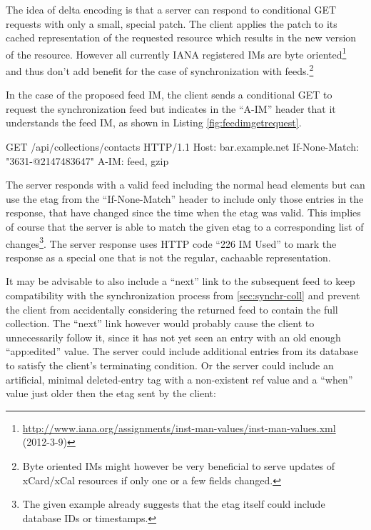 \documentclass[11pt,a4paper,headsepline,twoside]{scrartcl}		%
\newcommand{\citeurl}[2]{\url{#1} (#2)}
\begin{document}
The idea of delta encoding is that a server can respond to conditional GET
requests with only a small, special patch. The client applies the patch to its
cached representation of the requested resource which results in the new version
of the resource. However all currently IANA registered IMs are byte
oriented\footnote{\citeurl{http://www.iana.org/assignments/inst-man-values/inst-man-values.xml}{2012-3-9}}
and thus don't add benefit for the case of synchronization with
feeds.\footnote{Byte oriented IMs might however be very beneficial to serve
  updates of xCard/xCal resources if only one or a few fields changed.}

In the case of the proposed feed IM, the client sends a conditional GET to
request the synchronization feed but indicates in the ``A-IM'' header that it
understands the feed IM, as shown in Listing \ref{fig:feedimgetrequest}.

\begin{anylisting}[label=fig:feedimgetrequest,
                   float=h,
                   caption={HTTP GET request using feed delta encoding}]
GET /api/collections/contacts HTTP/1.1
Host: bar.example.net
If-None-Match: "3631-@2147483647"
A-IM: feed, gzip
\end{anylisting}

The server responds with a valid feed including the normal head elements but can
use the etag from the ``If-None-Match'' header to include only those entries in
the response, that have changed since the time when the etag was valid. This
implies of course that the server is able to match the given etag to a
corresponding list of changes\footnote{The given example already suggests that
  the etag itself could include database IDs or timestamps.}. The server
response uses HTTP code ``226 IM Used'' \cite{RFC3229} to mark the response as a
special one that is not the regular, cachaable representation.

It may be advisable to also include a ``next'' link to the subsequent feed to keep
compatibility with the synchronization process from \autoref{sec:synchr-coll}
and prevent the client from accidentally considering the returned feed to
contain the full collection. The ``next'' link however would probably cause the
client to unnecessarily follow it, since it has not yet seen an entry with an
old enough ``app:edited'' value. The server could include additional entries
from its database to satisfy the client's terminating condition. Or the server
could include an artificial, minimal
deleted-entry \cite{draft-snell-atompub-tombstones-14} tag with a non-existent
ref value and a ``when'' value just older then the etag sent by the client:
\end{document}
